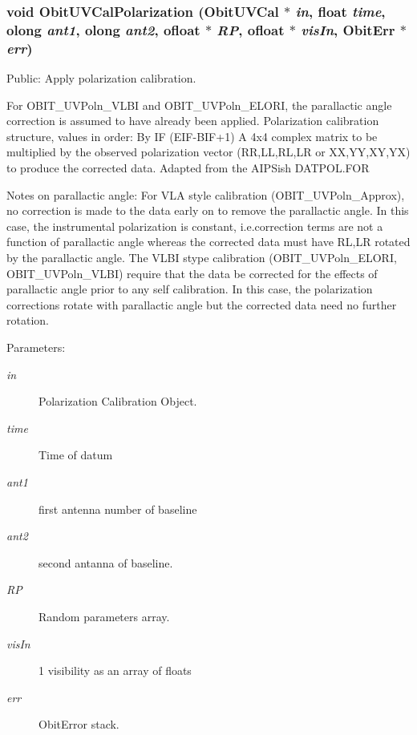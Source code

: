 \subsubsection{\setlength{\rightskip}{0pt plus 5cm}void Obit\-UVCal\-Polarization ({\bf Obit\-UVCal} $\ast$ {\em in}, float {\em time}, {\bf olong} {\em ant1}, {\bf olong} {\em ant2}, {\bf ofloat} $\ast$ {\em RP}, {\bf ofloat} $\ast$ {\em vis\-In}, {\bf Obit\-Err} $\ast$ {\em err})}\label{ObitUVCalPolarization_8c_a8}


Public: Apply polarization calibration. 

For OBIT\_\-UVPoln\_\-VLBI and OBIT\_\-UVPoln\_\-ELORI, the parallactic angle correction is assumed to have already been applied. Polarization calibration structure, values in order: By IF (EIF-BIF+1) A 4x4 complex matrix to be multiplied by the observed polarization vector (RR,LL,RL,LR or XX,YY,XY,YX) to produce the corrected data. Adapted from the AIPSish DATPOL.FOR

Notes on parallactic angle: For VLA style calibration (OBIT\_\-UVPoln\_\-Approx), no correction is made to the data early on to remove the parallactic angle. In this case, the instrumental polarization is constant, i.e.correction terms are not a function of parallactic angle whereas the corrected data must have RL,LR rotated by the parallactic angle. The VLBI stype calibration (OBIT\_\-UVPoln\_\-ELORI, OBIT\_\-UVPoln\_\-VLBI) require that the data be corrected for the effects of parallactic angle prior to any self calibration. In this case, the polarization corrections rotate with parallactic angle but the corrected data need no further rotation. \begin{Desc}
\item[Parameters:]
\begin{description}
\item[{\em in}]Polarization Calibration Object. \item[{\em time}]Time of datum \item[{\em ant1}]first antenna number of baseline \item[{\em ant2}]second antanna of baseline. \item[{\em RP}]Random parameters array. \item[{\em vis\-In}]1 visibility as an array of floats \item[{\em err}]Obit\-Error stack. \end{description}
\end{Desc}
